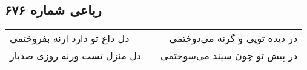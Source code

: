 \begin{center}
\section*{رباعی شماره ۶۷۶}
\label{sec:sh676}
\begin{longtable}{l p{0.5cm} r}
دل داغ تو دارد ارنه بفروختمی
&&
در دیده تویی و گرنه می‌دوختمی
\\
دل منزل تست ورنه روزی صدبار
&&
در پیش تو چون سپند می‌سوختمی
\\
\end{longtable}
\end{center}
